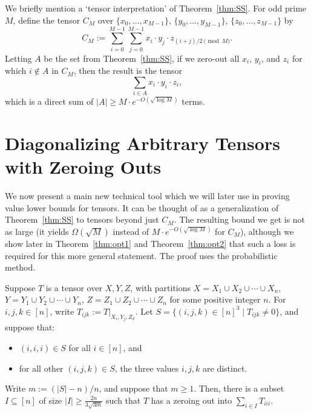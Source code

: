 \documentclass{theoretics}
\begin{document}
We briefly mention a `tensor interpretation' of Theorem~\ref{thm:SS}. For odd prime $M$, define the tensor $C_M$ over $\{x_0, \ldots, x_{M-1}\}$, $\{y_0, \ldots, y_{M-1}\}$, $\{z_0, \ldots, z_{M-1}\}$ by $$C_M := \sum_{i=0}^{M-1} \sum_{j=0}^{M-1} x_i \cdot y_j \cdot z_{(i+j)/2 \pmod{M}}.$$ Letting $A$ be the set from Theorem~\ref{thm:SS}, if we zero-out all $x_i$, $y_i$, and $z_i$ for which $i \notin A$ in $C_M$, then the result is the tensor $$\sum_{i \in A} x_i \cdot y_i \cdot z_{i},$$ which is a direct sum of $|A|\geq M \cdot e^{-O(\sqrt{\log M})}$ terms. 



\section{Diagonalizing Arbitrary Tensors with Zeroing Outs} \label{sec:newidea}

We now present a main new technical tool which we will later use in proving value lower bounds for tensors. It can be thought of as a generalization of Theorem~\ref{thm:SS} to tensors beyond just $C_M$. The resulting bound we get is not as large (it yields $\Omega(\sqrt{M})$ instead of $M \cdot e^{-O(\sqrt{\log M})}$ for $C_M$), although we show later in Theorem~\ref{thm:opt1} and Theorem~\ref{thm:opt2} that such a loss is required for this more general statement. The proof uses the probabilistic method.

\begin{theorem} \label{thm:newidea}
Suppose $T$ is a tensor over $X,Y,Z$, with partitions $X = X_1 \cup X_2 \cup \cdots \cup X_{n}$, $Y = Y_1 \cup Y_2 \cup \cdots \cup Y_{n}$, $Z = Z_1 \cup Z_2 \cup \cdots \cup Z_{n}$ for some positive integer $n$. For $i,j,k \in [n]$, write $T_{ijk} := T|_{X_i, Y_j, Z_k}$. Let $S = \{(i,j,k) \in [n]^3 \mid T_{ijk} \neq 0 \}$, and suppose that:
\begin{itemize}
    \item $(i,i,i) \in S$ for all $i \in [n]$, and
    \item for all other $(i,j,k) \in S$, the three values $i,j,k$ are distinct.
\end{itemize}
Write $m := (|S|-n)/n$, and suppose that $m \geq 1$. Then, there is a subset $I \subseteq [n]$ of size $|I| \geq \frac{2n}{3 \sqrt{3m}}$ such that $T$ has a zeroing out into $\sum_{i \in I} T_{iii}$.
\end{theorem}
\end{document}
